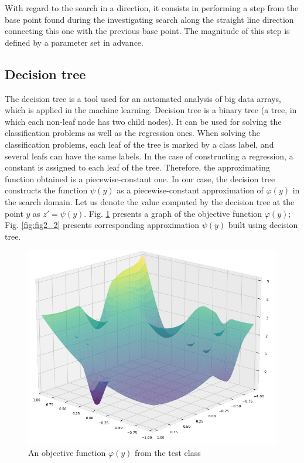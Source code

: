 \documentclass{svproc}
\begin{document}
With regard to the search in a direction, it consists in performing a step from the base point found  during the investigating search along the straight line direction connecting this one with the previous  base point. The magnitude of this step is defined by a parameter set in advance.



\subsection{Decision tree}\label{SecDT}

The decision tree is a tool used for an automated analysis of big data arrays, which is applied in the  machine learning. Decision tree is a binary tree (a tree, in which each non-leaf node has two child nodes). It can be used for solving the classification problems as well as the regression ones. When solving  the classification problems, each leaf of the tree is marked by a class label, and several leafs can have  the same labels. In the case of constructing a regression, a constant is assigned to each leaf of the tree.   Therefore, the approximating function obtained is a piecewise-constant one. In our case, the decision tree constructs the function $\psi(y)$ as a piecewise-constant  approximation of $\varphi(y)$ in the search domain. Let us denote the value  computed by the  decision tree at the point $y$ as $z' = \psi(y)$.
Fig. \ref{fig:fig2} presents a graph of the objective function $\varphi(y)$; Fig. \ref{fig:fig2_2} presents corresponding approximation $\psi(y)$ built using decision tree. 


\begin{figure}
	\begin{center}
		\begin{minipage}[h]{0.8\linewidth}
			\includegraphics[width=1\linewidth]{figure/fig5.png}
			\caption{An objective function $\varphi(y)$ from the test class} %
			\label{fig:fig2}
		\end{minipage}
	\end{center}
\end{figure}	
\end{document}
